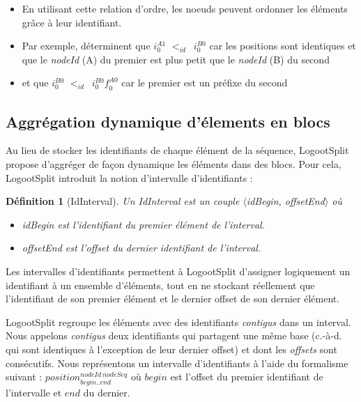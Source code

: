 \documentclass[12pt]{thesul}
\newtheorem{definition}{Définition}
\newcommand{\ie}{c.-à-d. }
\newcommand{\trm}[1]{\mathit{#1}}
\newcommand{\id}[3]{$\trm{#1}^{\trm{#2}}_{\trm{#3}}$}
\newcommand{\lid}{$<_{id}$~}
\begin{document}
\begin{itemize}
  \item En utilisant cette relation d'ordre, les noeuds peuvent ordonner les éléments grâce à leur identifiant.
  \item Par exemple, déterminent que \id{i}{A1}{0} \lid \id{i}{B0}{0} car les positions sont identiques et que le \emph{nodeId} (A) du premier est plus petit que le \emph{nodeId} (B) du second
  \item et que \id{i}{B0}{0} \lid \id{i}{B0}{0}\id{f}{A0}{0} car le premier est un préfixe du second
\end{itemize}


\subsection{Aggrégation dynamique d'élements en blocs}

\label{sec:blocs}

Au lieu de stocker les identifiants de chaque élément de la séquence, LogootSplit propose d'aggréger de façon dynamique les éléments dans des blocs.
Pour cela, LogootSplit introduit la notion d'intervalle d'identifiants :

\begin{definition}[IdInterval]
  Un \emph{IdInterval} est un couple $\langle$idBegin, offsetEnd$\rangle$ où
  \begin{itemize}
    \item idBegin est l'identifiant du premier élément de l'interval.
    \item offsetEnd est l'offset du dernier identifiant de l'interval.
  \end{itemize}
\end{definition}

Les intervalles d'identifiants permettent à LogootSplit d'assigner logiquement un identifiant à un ensemble d'éléments, tout en ne stockant réellement que l'identifiant de son premier élément et le dernier offset de son dernier élément.

LogootSplit regroupe les éléments avec des identifiants \emph{contigus} dans un interval.
Nous appelons \emph{contigus} deux identifiants qui partagent une même base (\ie qui sont identiques à l'exception de leur dernier offset) et dont les \emph{offsets} sont consécutifs.
Nous représentons un intervalle d'identifiants à l'aide du formalisme suivant : \id{position}{nodeId~nodeSeq}{begin..end} où $\trm{begin}$ est l'offset du premier identifiant de l'intervalle et $\trm{end}$ du dernier.
\end{document}
